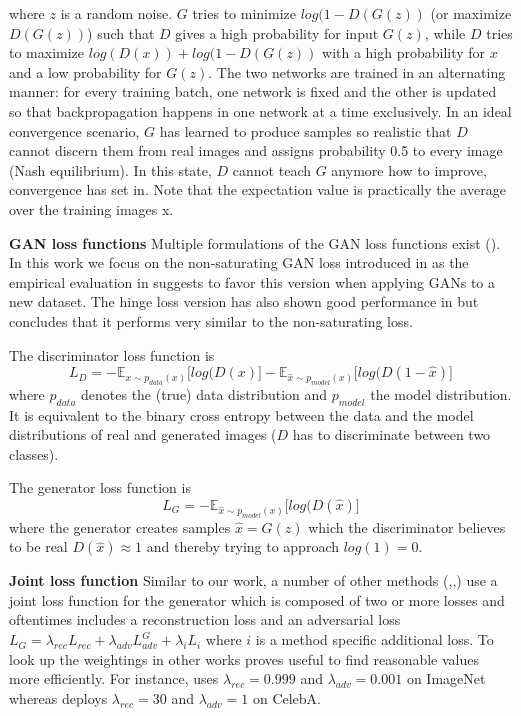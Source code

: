 \documentclass[11pt,a4paper]{article}
\begin{document}
where $z$ is a random noise. $G$ tries to minimize $log(1 - D(G(z))$ (or maximize $D(G(z))$) such that $D$ gives a high probability for input $G(z)$, while $D$ tries to maximize $log(D(x)) + log(1 - D(G(z))$ with a high probability for $x$ and a low probability for $G(z)$. The two networks are trained in an alternating manner: for every training batch, one network is fixed and the other is updated so that backpropagation happens in one network at a time exclusively. In an ideal convergence scenario, $G$ has learned to produce samples so realistic that $D$ cannot discern them from real images and assigns probability 0.5 to every image (Nash equilibrium). In this state, $D$ cannot teach $G$ anymore how to improve, convergence has set in. Note that the expectation value is practically the average over the training images x.

\par \textbf{GAN loss functions} 
Multiple formulations of the GAN loss functions exist (\cite{1807.04720}). In this work we focus on the non-saturating GAN loss introduced in \cite{1406.2661} as the empirical evaluation in \cite{1807.04720} suggests to favor this version when applying GANs to a new dataset. The hinge loss version has also shown good performance in \cite{1802.05957} but \cite{1807.04720} concludes that it performs very similar to the non-saturating loss.

The discriminator loss function is
\begin{equation} \label{eq:d_loss}
    L_{D} = -\mathbb{E}_{x\sim p_{data} (x)}\big[log(D(x)\big] - \mathbb{E}_{\hat{x}\sim p_{model} (x)}\big[log(D(1 - \hat{x})\big]
\end{equation}
where $p_{data}$ denotes the (true) data distribution and $p_{model}$ the model distribution. It is equivalent to the binary cross entropy between the data and the model distributions of real and generated images ($D$ has to discriminate between two classes).

The generator loss function is
\begin{equation} \label{eq:g_loss}
    L_{G} = -\mathbb{E}_{\hat{x}\sim p_{model} (x)}\big[log(D(\hat{x})\big]
\end{equation}
where the generator creates samples $\hat{x} = G(z)$ which the discriminator believes to be real $D(\hat{x}) \approx 1$ and thereby trying to approach $log(1) = 0$.

\par \textbf{Joint loss function}
Similar to our work, a number of other methods (\cite{1511.05440},\cite{1711.07410},\cite{1604.07379}) use a joint loss function for the generator which is composed of two or more losses and oftentimes includes a reconstruction loss and an adversarial loss $L_G = \lambda_{rec}L_{rec} + \lambda_{adv}L^G_{adv} + \lambda_{i}L_{i}$ where $i$ is a method specific additional loss. To look up the weightings in other works proves useful to find reasonable values more efficiently. For instance, \cite{1604.07379} uses $\lambda_{rec} = 0.999$ and $\lambda_{adv} = 0.001$ on ImageNet whereas \cite{1711.07410} deploys $\lambda_{rec} = 30$ and $\lambda_{adv} = 1$ on CelebA.
\end{document}
